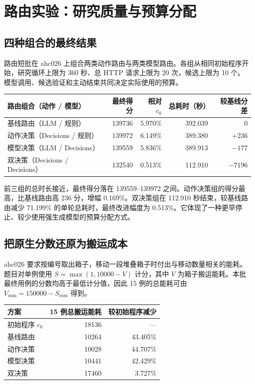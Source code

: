 \section{路由实验：研究质量与预算分配}\label{sec:routing}
\subsection{四种组合的最终结果}
路由短批在 ahc026 上组合两类动作路由与两类模型路由。各组从相同初始程序开始，研究循环上限为 360 秒、总 HTTP 请求上限为 20 次，候选上限为 10 个。模型调用、候选验证和主动结束共同决定实际使用的预算。


\begin{smalltable}
\begin{tabularx}{\linewidth}{@{}Lrrrr@{}}\toprule
路由组合（动作 / 模型） & 最终得分 & 相对 $c_0$ & 总耗时（秒） & 较基线分差\\\midrule
基线路由（LLM / 规则） & 139736 & 5.970\% & 392.039 & 0\\
动作决策（Decisions / 规则） & 139972 & 6.149\% & 389.380 & +236\\
模型决策（LLM / Decisions） & 139559 & 5.836\% & 389.913 & $-177$\\
双决策（Decisions / Decisions） & 132540 & 0.513\% & 112.910 & $-7196$\\\bottomrule
\end{tabularx}
\end{smalltable}

前三组的总时长接近，最终得分落在 139559--139972 之间。动作决策组的得分最高，比基线路由高 236 分，增幅 0.169\%。双决策组在 112.910 秒结束，较基线路由减少 71.199\% 的单轮总耗时，最终改进幅度为 0.513\%。它体现了一种更早停止、较少使用强生成模型的预算分配方式。

\subsection{把原生分数还原为搬运成本}
ahc026 要求按编号取出箱子，移动一段堆叠箱子时付出与移动数量相关的能耗。题目对单例使用 $S=\max(1,10000-V)$ 计分，其中 $V$ 为箱子搬运能耗。本批最终用例的分数均高于最低计分值，因此 15 例的总能耗可由 $V_{\mathrm{sum}}=150000-S_{\mathrm{sum}}$ 得到。

\begin{smalltable}
\begin{tabularx}{\linewidth}{@{}Lrr@{}}\toprule
方案 & 15 例总搬运能耗 & 较初始程序减少\\\midrule
初始程序 $c_0$ & 18136 & ---\\
基线路由 & 10264 & 43.405\%\\
动作决策 & 10028 & 44.707\%\\
模型决策 & 10441 & 42.429\%\\
双决策 & 17460 & 3.727\%\\\bottomrule
\end{tabularx}
\end{smalltable}

